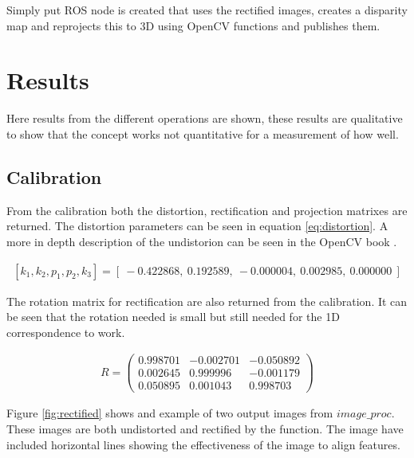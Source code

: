 Simply put ROS node is created that uses the rectified images, creates a disparity map and reprojects this to 3D using OpenCV functions and publishes them.
 
\section{Results}

Here results from the different operations are shown, these results are qualitative to show that the concept works not quantitative for a measurement of how well.

\subsection{Calibration}

From the calibration both the distortion, rectification and projection matrixes are returned. The distortion parameters can be seen in equation \ref{eq:distortion}. A more in depth description of the undistorion can be seen in the OpenCV book \cite{locv}.



\begin{equation}\label{eq:distortion}
\begin{split}
[ k_{1}, k_{2}, p_{1}, p_{2}, k_{3} ] = [\ -0.422868,\ 0.192589,\ -0.000004,\ 0.002985,\ 0.000000\ ]
\end{split}
\end{equation} 

The rotation matrix for rectification are also returned from the calibration. It can be seen that the rotation needed is small but still needed for the 1D correspondence to work. 

\begin{equation}\label{eq:distortion}
\begin{split}
R =
 \begin{pmatrix}
  0.998701 & -0.002701 & -0.050892 \\
  0.002645 & 0.999996 & -0.001179 \\
  0.050895 & 0.001043 & 0.998703 
 \end{pmatrix}
\end{split}
\end{equation}

Figure \ref{fig:rectified} shows and example of two output images from $image\_proc$. These images are both undistorted and rectified by the function. The image have included horizontal lines showing the effectiveness of the image to align features.

